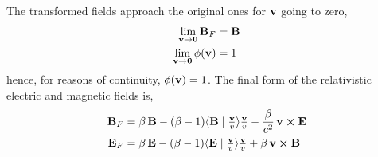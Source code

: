 \documentclass[12pt]{article}
\newcommand{\ip}[2]{\langle #1 \mid #2 \rangle}
\begin{document}
The transformed fields approach the original ones for $\vb{v}$ going to zero,
\begin{align}
  \lim_{\vb{v} \to \vb{0}} \vb{B}_F     &= \vb{B} \\
  \lim_{\vb{v} \to \vb{0}} \phi(\vb{v}) &= 1
\end{align}
hence, for reasons of continuity, $\phi(\vb{v}) = 1$. The final form of the relativistic
electric and magnetic fields is,
\begin{align}
  \vb{B}_F &= \beta\,\vb{B}
    - (\beta-1)\ip{\vb{B}}{\tfrac{\vb{v}}{v}}\tfrac{\vb{v}}{v}
    - \frac{\beta}{c^2}\,\vb{v} \cross \vb{E} \label{eq:relativistic_maxwell} \\
  \vb{E}_F &= \beta\,\vb{E}
    - (\beta-1)\ip{\vb{E}}{\tfrac{\vb{v}}{v}}\tfrac{\vb{v}}{v}
    + \beta\,\vb{v} \cross \vb{B} \nonumber
\end{align}
\end{document}
